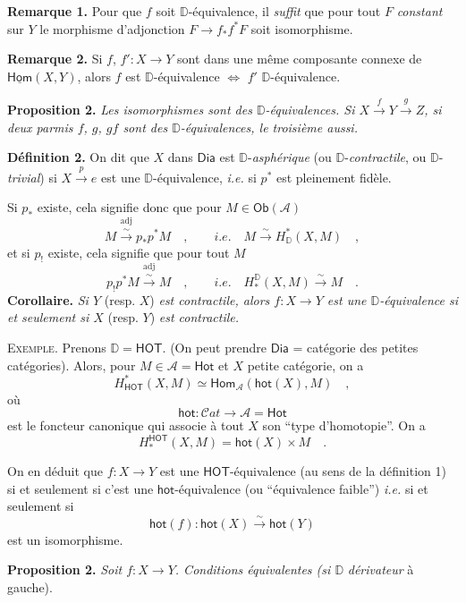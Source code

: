 \documentclass[11pt,leqno]{article}
\newcommand{\printedpage}[1]{\marginpar{\footnotesize p.~#1}}
\newcommand{\msp}[1]{\marginpar{\footnotesize [#1]}}
\newcommand{\DD}{\mathbb{D}}
\newcommand{\cA}{\mathcal{A}}
\newcommand{\Dia}{\mathsf{Dia}}
\newcommand{\Ob}{\mathsf{Ob}}
\newcommand{\Hom}{\mathsf{Hom}}
\newcommand{\hot}{\mathsf{hot}}
\newcommand{\Hot}{\mathsf{Hot}}
\newcommand{\HOT}{\mathsf{HOT}}
\newcommand{\isolongto}{\overset{\sim}{\longrightarrow}}
\begin{document}
\noindent\textbf{Remarque 1.} Pour que $f$ soit $\DD$-équivalence, il \textit{suffit} que pour tout $F$ \textit{constant} sur $Y$ le morphisme d'adjonction $F \to f_*f^*F$ soit isomorphisme.

\noindent\textbf{Remarque 2.} Si $f$, $f' : X \to Y$ sont dans une même composante connexe de $\underline{\Hom}(X, Y)$, alors $f$ est $\DD$-équivalence $\Leftrightarrow$ $f'$ $\DD$-équivalence.

\noindent\textbf{Proposition 2.} \textit{Les isomorphismes sont des $\DD$-équivalences. Si $X \overset{f}{\to} Y \overset{g}{\to} Z$, si deux parmis $f$, $g$, $gf$ sont des $\DD$-équivalences, le troisième aussi.} %

\noindent\textbf{Définition 2.} On dit que $X$ dans $\Dia$ est $\DD$-\textit{asphérique} (ou $\DD$-\textit{contractile}, ou $\DD$-\textit{trivial}) si $X \overset{p}{\to} e$ est une $\DD$-équivalence, \textit{i.e.} si $p^*$ est pleinement fidèle.

Si $p_*$ existe, cela signifie donc que pour $M \in \Ob(\cA)$
\[
M \overset{\mathrm{adj}}{\isolongto} p_*p^*M \quad , \qquad \textit{i.e.} \quad M \isolongto H^*_{\DD}(X, M) \quad ,
\]
et si $p_!$ existe, cela signifie que pour tout $M$
\[
p_!p^*M \overset{\mathrm{adj}}{\isolongto} M \quad , \qquad \textit{i.e.} \quad H^{\DD}_*(X, M) \isolongto M \quad .
\]
\textbf{Corollaire.} \textit{Si $Y$} (resp. $X$) \textit{est contractile, alors $f : X \to Y$ est une $\DD$-équivalence si et seulement si $X$} (resp. $Y$) \textit{est contractile.}

\noindent\textsc{Exemple}. Prenons $\DD = \HOT$. (On peut prendre $\Dia$ = catégorie des petites catégories). Alors, pour $M \in \cA = \Hot$ et $X$ petite catégorie, on a
\[
H^*_{\HOT}(X, M) \simeq \Hom_{\cA}(\hot(X), M) \quad ,
\]
où
\[
\hot : \mathcal{C}\mathit{at} \longrightarrow \cA = \Hot
\]
est le foncteur canonique qui associe à tout $X$ son “type d'homotopie”. On a
\[
H^{\HOT}_*(X, M) = \hot(X) \times M \quad .
\]

\noindent\msp{page 63}

\noindent On en déduit que $f : X \to Y$ est une $\HOT$-équivalence (au sens de la définition 1) si et seulement si c'est une $\hot$-équivalence (ou “équivalence faible”) \textit{i.e.} si et seulement si
\[
\hot(f) : \hot(X) \isolongto \hot(Y)
\]
\printedpage{37}
est un isomorphisme.

\noindent\textbf{Proposition 2.} \textit{Soit $f : X \to Y$. Conditions équivalentes (si $\DD$} \textit{dérivateur} à gauche). %
\end{document}
